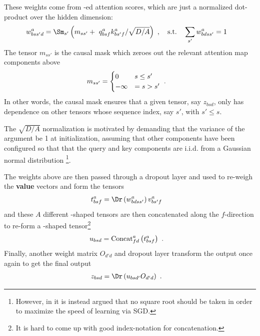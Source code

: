 \documentclass[11pt]{article}
\begin{document}
 These weights come from -ed attention scores, which are just a normalized
 dot-product over the hidden dimension:
\begin{align}
    w ^{ a }_{ bss'd } &=\Sm _{ s' } \left (m _{ s s' }+\ q ^{ a }_{ bsf }k ^{ a }_{ bs'f } / \sqrt{D/A} \right
        )\ ,  \quad {\rm s.t.} \quad \sum_{s'}w ^{ a }_{ bdss' } =1
\end{align}
The tensor $ m _{  s s' } $ is the causal mask which zeroes out the relevant attention map
components above
\begin{align}
    m _{ s s' } &= \begin{cases}
            0 & s \le s' \nonumber\\
            -\infty &= s > s'
        \end{cases}\ .
\end{align}
In other words, the causal mask ensures that a given tensor, say $ z _{ bsd } $, only has dependence on
other tensors whose sequence index, say $ s' $, with $ s' \le s $.

The $ \sqrt{D/A} $ normalization is motivated by demanding
that the variance of the  argument be 1 at initialization, assuming that other
components have been configured so that that the query and key components are i.i.d. from a Gaussian
normal distribution \footnote{However, in \cite{yang2022tensor} it is instead argued that no square
root should be taken in order to maximize the speed of learning via SGD.}.

The weights above are then passed through a dropout layer and used to re-weigh the \textbf{value} vectors and form the tensors
\begin{align}
  t ^{ a }_{ bsf }&=\Dr  \left (w ^{ a }_{ bdss' } \right ) v ^{ a }_{ bs'f }
  \label{eq_reweighted_values}
\end{align}
and these $ A $ different -shaped tensors
are then concatenated along the $ f $-direction to re-form a -shaped
tensor\footnote{It is hard to come up with good index-notation for concatenation.}
\begin{align}
    u _{ bsd } &= {\rm Concat}^{ a }_{ fd } \left ( t ^{ a }_{ bsf }\right )\ .
\end{align}
Finally, another weight matrix $ O _{d' d } $ and dropout layer transform the output once again to get the final
output
\begin{align}
  z _{ bsd } &= \Dr \left (u  _{ bsd' } O _{ d'd }\right )\ .
\end{align}
\end{document}
